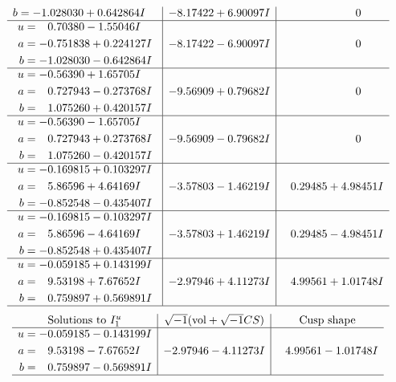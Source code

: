 \documentclass[1p]{elsarticle_modified}
\theoremstyle{definition}
\newcommand{\I}{\sqrt{-1}}
\begin{document}
$$\begin{array}{c|c|c}
\begin{aligned}
b &= -1.028030 + 0.642864 I\end{aligned}
 & -8.17422 + 6.90097 I & \phantom{-0.000000 } 0 \\ \hline\begin{aligned}
u &= \phantom{-}0.70380 - 1.55046 I \\
a &= -0.751838 + 0.224127 I \\
b &= -1.028030 - 0.642864 I\end{aligned}
 & -8.17422 - 6.90097 I & \phantom{-0.000000 } 0 \\ \hline\begin{aligned}
u &= -0.56390 + 1.65705 I \\
a &= \phantom{-}0.727943 - 0.273768 I \\
b &= \phantom{-}1.075260 + 0.420157 I\end{aligned}
 & -9.56909 + 0.79682 I & \phantom{-0.000000 } 0 \\ \hline\begin{aligned}
u &= -0.56390 - 1.65705 I \\
a &= \phantom{-}0.727943 + 0.273768 I \\
b &= \phantom{-}1.075260 - 0.420157 I\end{aligned}
 & -9.56909 - 0.79682 I & \phantom{-0.000000 } 0 \\ \hline\begin{aligned}
u &= -0.169815 + 0.103297 I \\
a &= \phantom{-}5.86596 + 4.64169 I \\
b &= -0.852548 - 0.435407 I\end{aligned}
 & -3.57803 - 1.46219 I & \phantom{-}0.29485 + 4.98451 I \\ \hline\begin{aligned}
u &= -0.169815 - 0.103297 I \\
a &= \phantom{-}5.86596 - 4.64169 I \\
b &= -0.852548 + 0.435407 I\end{aligned}
 & -3.57803 + 1.46219 I & \phantom{-}0.29485 - 4.98451 I \\ \hline\begin{aligned}
u &= -0.059185 + 0.143199 I \\
a &= \phantom{-}9.53198 + 7.67652 I \\
b &= \phantom{-}0.759897 + 0.569891 I\end{aligned}
 & -2.97946 + 4.11273 I & \phantom{-}4.99561 + 1.01748 I\\
 \hline 
 \end{array}$$\newpage$$\begin{array}{c|c|c}  
\text{Solutions to }I^u_{1}& \I (\text{vol} + \sqrt{-1}CS) & \text{Cusp shape}\\
 \hline 
\begin{aligned}
u &= -0.059185 - 0.143199 I \\
a &= \phantom{-}9.53198 - 7.67652 I \\
b &= \phantom{-}0.759897 - 0.569891 I\end{aligned}
 & -2.97946 - 4.11273 I & \phantom{-}4.99561 - 1.01748 I\\
 \hline 
 \end{array}$$\newpage\newpage\renewcommand{\arraystretch}{1}
\end{document}
